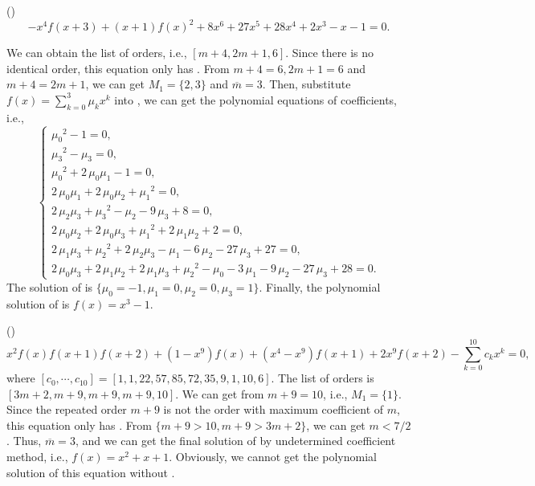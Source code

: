 \begin{example}
(\BPone{})
\begin{equation}
-x^4f(x+3)+(x+1)f(x)^2+8x^6+27x^5+28x^4+2x^3-x-1=0 \label{ep1} .
\end{equation}

We can obtain the list of orders, i.e., $[m+4,2m+1,6]$. Since there is no identical order, this equation only has \BPone{}. From $m+4=6,2m+1=6$ and $m+4=2m+1$, we can get $M_1=\{2,3\}$ and $\overline m = 3$. Then, substitute $f(x)=\sum\nolimits_{k=0}^3{\mu_k x^k}$ into , we can get the polynomial equations of coefficients, i.e.,
\begin{equation}
\left\{
\begin{array}{l}
    {\mu_{{0}}}^{2}-1=0,                                                                                                  \\
    {\mu_{{3}}}^{2}-\mu_{{3}}=0,                                                                                            \\
    {\mu_{{0}}}^{2}+2\,\mu_{{0}}\mu_{{1}}-1=0,                                                                                \\
    2\,\mu_{{0}}\mu_{{1}}+2\,\mu_{{0}}\mu_{{2}}+{\mu_{{1}}}^{2}=0,                                                                \\
    2\,\mu_{{2}}\mu_{{3}}+{\mu_{{3}}}^{2}-\mu_{{2}}-9\,\mu_{{3}}+8=0,                                                             \\
    2\,\mu_{{0}}\mu_{{2}}+2\,\mu_{{0}}\mu_{{3}}+{\mu_{{1}}}^{2}+2\,\mu_{{1}}\mu_{{2}}+2=0,                                            \\
    2\,\mu_{{1}}\mu_{{3}}+{\mu_{{2}}}^{2}+2\,\mu_{{2}}\mu_{{3}}-\mu_{{1}}-6\,\mu_{{2}}-27\,\mu_{{3}}+27=0,                              \\
    2\,\mu_{{0}}\mu_{{3}}+2\,\mu_{{1}}\mu_{{2}}+2\,\mu_{{1}}\mu_{{3}}+{\mu_{{2}}}^{2}-\mu_{{0}}-3\,\mu_{{1}}-9\,\mu_{{2}}-27\,\mu_{{3}}+28=0.
\end{array}
\right.
\label{ceqs}
\end{equation}
The solution of  is $\{\mu_0=-1,\mu_1=0,\mu_2=0,\mu_3=1\}$. Finally, the polynomial solution of  is $f(x)=x^3-1$.
\end{example}

\begin{example}
(\BPtwo{})
\begin{equation}
x^2f(x)f(x+1)f(x+2)+(1-x^9)f(x)+(x^4-x^9)f(x+1)+2x^9f(x+2)-\sum_{k=0}^{10}{c_k x^k}=0, \label{ep2}
\end{equation}
where $[c_0,\cdots,c_{10}]=[1,1,22,57,85,72,35,9,1,10,6]$. The list of orders is $[3m+2,m+9,m+9,m+9,10]$. We can get \BPone{} from $m+9=10$, i.e., $M_1=\{1\}$. Since the repeated order $m+9$ is not the order with maximum coefficient of $m$, this equation only has \BPtwo{}. From $\{m+9> 10,m+9> 3m+2\}$, we can get $m< 7/2$. Thus, $\overline m=3$, and we can get the final solution of  by undetermined coefficient method, i.e., $f(x)=x^2+x+1$. Obviously, we cannot get the polynomial solution of this equation without \BPtwo{}.
\end{example}

